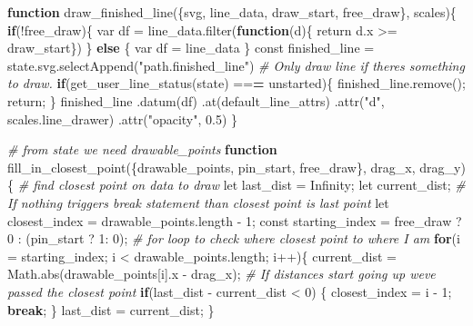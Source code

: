 \documentclass[print]{nuthesis}
\newenvironment{Shaded}{\begin{snugshade}}{\end{snugshade}}
\newcommand{\AttributeTok}[1]{\textcolor[rgb]{0.77,0.63,0.00}{#1}}
\newcommand{\CommentTok}[1]{\textcolor[rgb]{0.56,0.35,0.01}{\textit{#1}}}
\newcommand{\ControlFlowTok}[1]{\textcolor[rgb]{0.13,0.29,0.53}{\textbf{#1}}}
\newcommand{\DecValTok}[1]{\textcolor[rgb]{0.00,0.00,0.81}{#1}}
\newcommand{\ErrorTok}[1]{\textcolor[rgb]{0.64,0.00,0.00}{\textbf{#1}}}
\newcommand{\FloatTok}[1]{\textcolor[rgb]{0.00,0.00,0.81}{#1}}
\newcommand{\FunctionTok}[1]{\textcolor[rgb]{0.00,0.00,0.00}{#1}}
\newcommand{\NormalTok}[1]{#1}
\newcommand{\OtherTok}[1]{\textcolor[rgb]{0.56,0.35,0.01}{#1}}
\newcommand{\SpecialCharTok}[1]{\textcolor[rgb]{0.00,0.00,0.00}{#1}}
\newcommand{\StringTok}[1]{\textcolor[rgb]{0.31,0.60,0.02}{#1}}
\begin{document}
\begin{Shaded}
\begin{Highlighting}[]
\ControlFlowTok{function} \FunctionTok{draw\_finished\_line}\NormalTok{(\{svg, line\_data, draw\_start, free\_draw\}, scales)\{}
  \ControlFlowTok{if}\NormalTok{(}\SpecialCharTok{!}\NormalTok{free\_draw)\{}
\NormalTok{    var df }\OtherTok{=} \FunctionTok{line\_data.filter}\NormalTok{(}\ControlFlowTok{function}\NormalTok{(d)\{ return d.x }\SpecialCharTok{\textgreater{}=}\NormalTok{ draw\_start\})}
\NormalTok{  \} }\ControlFlowTok{else}\NormalTok{ \{}
\NormalTok{    var df }\OtherTok{=}\NormalTok{ line\_data}
\NormalTok{  \}}
\NormalTok{  const finished\_line }\OtherTok{=} \FunctionTok{state.svg.selectAppend}\NormalTok{(}\StringTok{"path.finished\_line"}\NormalTok{)}
    \CommentTok{\# Only draw line if there\textquotesingle{}s something to draw.}
  \ControlFlowTok{if}\NormalTok{(}\FunctionTok{get\_user\_line\_status}\NormalTok{(state) }\SpecialCharTok{==}\ErrorTok{=} \StringTok{\textquotesingle{}unstarted\textquotesingle{}}\NormalTok{)\{}
    \FunctionTok{finished\_line.remove}\NormalTok{();}
\NormalTok{    return;}
\NormalTok{  \}}
\NormalTok{  finished\_line}
  \FunctionTok{.datum}\NormalTok{(df)}
  \FunctionTok{.at}\NormalTok{(default\_line\_attrs)}
  \FunctionTok{.attr}\NormalTok{(}\StringTok{"d"}\NormalTok{, scales.line\_drawer)}
  \FunctionTok{.attr}\NormalTok{(}\StringTok{"opacity"}\NormalTok{, }\FloatTok{0.5}\NormalTok{)}
\NormalTok{\}}

\CommentTok{\# from state we need drawable\_points}
\ControlFlowTok{function} \FunctionTok{fill\_in\_closest\_point}\NormalTok{(\{drawable\_points, pin\_start, free\_draw\}, drag\_x, drag\_y)\{}
  \CommentTok{\# find closest point on data to draw}
\NormalTok{  let last\_dist }\OtherTok{=}\NormalTok{ Infinity;}
\NormalTok{  let current\_dist;}
  \CommentTok{\# If nothing triggers break statement than closest point is last point}
\NormalTok{  let closest\_index }\OtherTok{=}\NormalTok{ drawable\_points.length }\SpecialCharTok{{-}} \DecValTok{1}\NormalTok{;}
\NormalTok{  const starting\_index }\OtherTok{=}\NormalTok{ free\_draw ? }\DecValTok{0} \SpecialCharTok{:}\NormalTok{ (pin\_start ? }\DecValTok{1}\SpecialCharTok{:} \DecValTok{0}\NormalTok{);}
  \CommentTok{\# for loop to check where closest point to where I am}
  \ControlFlowTok{for}\NormalTok{(}\AttributeTok{i =}\NormalTok{ starting\_index; i }\SpecialCharTok{\textless{}}\NormalTok{ drawable\_points.length; i}\SpecialCharTok{++}\NormalTok{)\{}
\NormalTok{    current\_dist }\OtherTok{=} \FunctionTok{Math.abs}\NormalTok{(drawable\_points[i].x }\SpecialCharTok{{-}}\NormalTok{ drag\_x);}
    \CommentTok{\# If distances start going up we\textquotesingle{}ve passed the closest point}
\ControlFlowTok{if}\NormalTok{(last\_dist }\SpecialCharTok{{-}}\NormalTok{ current\_dist }\SpecialCharTok{\textless{}} \DecValTok{0}\NormalTok{) \{}
\NormalTok{  closest\_index }\OtherTok{=}\NormalTok{ i }\SpecialCharTok{{-}} \DecValTok{1}\NormalTok{;}
  \ControlFlowTok{break}\NormalTok{;}
\NormalTok{\}}
\NormalTok{last\_dist }\OtherTok{=}\NormalTok{ current\_dist;}
\NormalTok{\}}


\end{Highlighting}
\end{Shaded}
\end{document}
